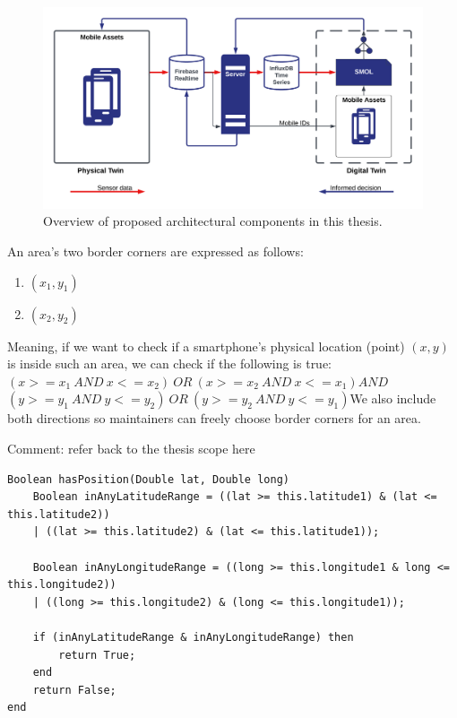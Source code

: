 \documentclass{article}
\begin{document}
\begin{figure}[H]
    \centering
    \includegraphics[scale=0.12]{graphics/thesis_overview.png}
    \caption{Overview of proposed architectural components in this thesis.}
    \label{fig:components}
\end{figure}

An area's two border corners are expressed as follows:
\begin{enumerate}
    \item $(x_1, y_1)$
    \item $(x_2, y_2)$
\end{enumerate}
Meaning, if we want to check if a smartphone's physical location (point) $(x, y)$ is inside such an area, we can check if the following is true:\newline\newline$(x >= x_1\:AND\: x <= x_2)\:OR\:(x >= x_2\:AND\:x <= x_1)$\newline$AND$\newline$(y >= y_1\:AND\:y <= y_2)\:OR\:(y >= y_2\:AND\:y <= y_1)$\newline We also include both directions so maintainers can freely choose border corners for an area. 

Comment: refer back to the thesis scope here
\begin{verbatim}
Boolean hasPosition(Double lat, Double long)
    Boolean inAnyLatitudeRange = ((lat >= this.latitude1) & (lat <= this.latitude2)) 
    | ((lat >= this.latitude2) & (lat <= this.latitude1));
    
    Boolean inAnyLongitudeRange = ((long >= this.longitude1 & long <= this.longitude2)) 
    | ((long >= this.longitude2) & (long <= this.longitude1));

    if (inAnyLatitudeRange & inAnyLongitudeRange) then
        return True;
    end
    return False;
end
\end{verbatim}
\end{document}

